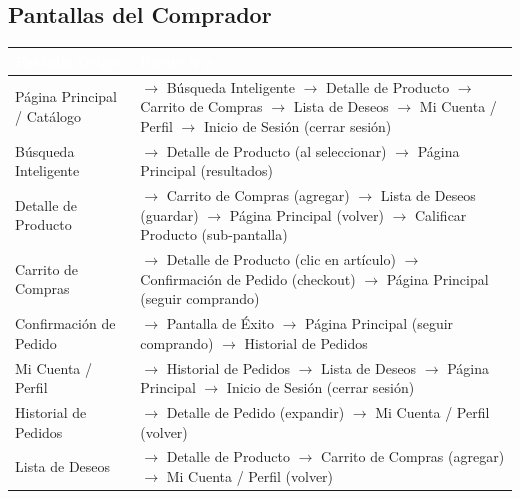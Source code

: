 \documentclass[12pt,a4paper]{article}
\begin{document}
\subsection{Pantallas del Comprador}
\begin{longtable}{|p{5cm}|p{9cm}|}
\hline
\rowcolor{darkbg}\textcolor{white}{\textbf{Pantalla Origen}} & \textcolor{white}{\textbf{Puede ir a}} \\
\hline
Página Principal / Catálogo & $\rightarrow$ Búsqueda Inteligente \newline $\rightarrow$ Detalle de Producto \newline $\rightarrow$ Carrito de Compras \newline $\rightarrow$ Lista de Deseos \newline $\rightarrow$ Mi Cuenta / Perfil \newline $\rightarrow$ Inicio de Sesión (cerrar sesión) \\
\hline
Búsqueda Inteligente & $\rightarrow$ Detalle de Producto (al seleccionar) \newline $\rightarrow$ Página Principal (resultados) \\
\hline
Detalle de Producto & $\rightarrow$ Carrito de Compras (agregar) \newline $\rightarrow$ Lista de Deseos (guardar) \newline $\rightarrow$ Página Principal (volver) \newline $\rightarrow$ Calificar Producto (sub-pantalla) \\
\hline
Carrito de Compras & $\rightarrow$ Detalle de Producto (clic en artículo) \newline $\rightarrow$ Confirmación de Pedido (checkout) \newline $\rightarrow$ Página Principal (seguir comprando) \\
\hline
Confirmación de Pedido & $\rightarrow$ Pantalla de Éxito \newline $\rightarrow$ Página Principal (seguir comprando) \newline $\rightarrow$ Historial de Pedidos \\
\hline
Mi Cuenta / Perfil & $\rightarrow$ Historial de Pedidos \newline $\rightarrow$ Lista de Deseos \newline $\rightarrow$ Página Principal \newline $\rightarrow$ Inicio de Sesión (cerrar sesión) \\
\hline
Historial de Pedidos & $\rightarrow$ Detalle de Pedido (expandir) \newline $\rightarrow$ Mi Cuenta / Perfil (volver) \\
\hline
Lista de Deseos & $\rightarrow$ Detalle de Producto \newline $\rightarrow$ Carrito de Compras (agregar) \newline $\rightarrow$ Mi Cuenta / Perfil (volver) \\
\hline
\end{longtable}
\end{document}
